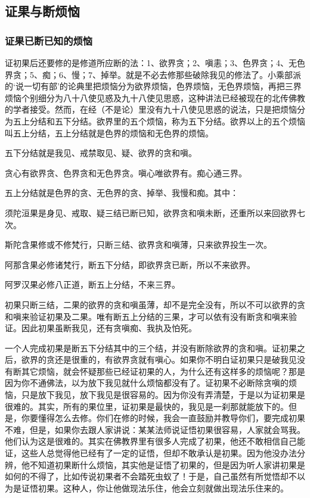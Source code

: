\documentclass{book}
\begin{document}
\subsection{证果与断烦恼}

\subsubsection{证果已断已知的烦恼}

证初果后还要修的是修道所应断的法：1、欲界贪；2、嗔恚；3、色界贪；4、无色界贪；5、痴；6、慢；7、掉举。就是不必去修那些破除我见的修法了。小乘部派的`说一切有部'的论典里把烦恼分为欲界烦恼，色界烦恼，无色界烦恼，再把三界烦恼个别细分为八十八使见惑及九十八使见思惑，这种讲法已经被现在的北传佛教的学者接受。然而，在经（不是论）里没有九十八使见思惑的说法，只是把烦恼分为五上分结和五下分结。欲界里的五个烦恼，称为五下分结。欲界以上的五个烦恼叫五上分结，五上分结就是色界的烦恼和无色界的烦恼。

五下分结就是我见、戒禁取见、疑、欲界的贪和嗔。

贪心有欲界贪、色界贪和无色界贪。嗔心唯欲界有。痴心通三界。

五上分结就是色界的贪、无色界的贪、掉举、我慢和痴。其中：

须陀洹果是身见、戒取、疑三结已断已知，欲界贪和嗔未断，还重所以来回欲界七次。

斯陀含果修或不修梵行，只断三结、欲界贪和嗔薄，只来欲界投生一次。

阿那含果必修诸梵行，断五下分结，即欲界贪已断，所以不来欲界。

阿罗汉果必修八正道，断五上分结，不来三界。

初果只断三结，二果的欲界的贪和嗔虽薄，却不是完全没有，所以不可以欲界的贪和嗔来验证初果及二果。唯有断五上分结的三果，才可以依有没有断贪和嗔来验证。因此初果虽断我见，还有贪嗔痴、我执及怕死。

一个人完成初果是断五下分结其中的三个结，并没有断除欲界的贪和嗔。证初果之后，欲界的贪还是很重的，有欲界贪就有嗔心。如果你不明白证初果只是破我见没有断其它烦恼，就会怀疑那些已经证初果的人，为什么还有这样多的烦恼呢？那是因为你不通佛法，以为放下我见就什么烦恼都没有了。证初果不必断除贪嗔的烦恼，只是放下我见，放下我见是很容易的。因为你没有弄清楚，于是以为证初果是很难的。其实，所有的果位里，证初果是最快的，我见是一刹那就能放下的。但是，你要懂得怎么去修。你们在修的时候，我会一直鼓励并教导你们，要完成初果不难，但是，如果你去跟人家讲说：某某法师说证悟初果很容易，人家就会骂我。他们认为这是很难的。其实在佛教界里有很多人完成了初果，他还不敢相信自己能证，这些人总觉得他已经有了一定的证悟，但却不敢承认是初果。因为他没办法分辨，他不知道初果断什么烦恼，其实他是证悟了初果的，但是因为听人家讲初果是如何的不得了，比如传说初果者不会踏死虫蚁了！于是，自己虽然有所觉悟却不以为是证悟初果。这种人，你让他做现法乐住，他会立刻就做出现法乐住来的。
\end{document}
